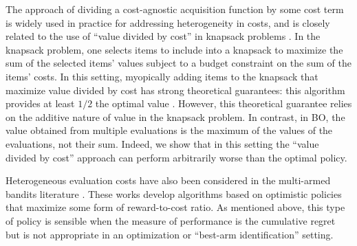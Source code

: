 

 The approach of dividing a cost-agnostic acquisition function by some cost term is widely used in practice for addressing heterogeneity in costs, and  
is closely related to the use of ``value divided by cost'' in knapsack problems \citep{badanidiyuru2013bandits}.
In the knapsack problem, one selects items to include into a knapsack to maximize the sum of the selected items' values subject to a budget constraint on the sum of the items' costs.
In this setting, myopically adding items to the knapsack that maximize value divided by cost has strong theoretical guarantees: %
this algorithm provides at least $1/2$ the optimal value \citep{williamson2011design}.
However, this theoretical guarantee relies on the additive nature of value in the knapsack problem. In contrast, in BO, the value obtained from multiple evaluations is the maximum of the values of the evaluations, not their sum. Indeed, we show that in this setting the ``value divided by cost'' approach can perform arbitrarily worse than the optimal policy.


 Heterogeneous evaluation costs have also been considered in the multi-armed bandits literature \citep{badanidiyuru2013bandits,xia2015thompson,xia2016budgeted}. These works develop algorithms based on optimistic policies that maximize some form of reward-to-cost ratio. As mentioned above, this type of policy is sensible when the measure of performance is the cumulative regret but is not appropriate in an optimization or ``best-arm identification'' setting.

